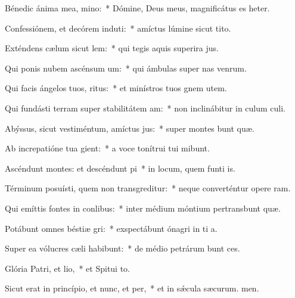\item Bénedic ánima mea, mino:~* Dómine, Deus meus, magnificátus es heter.
\item Confessiónem, et decórem induti:~* amíctus lúmine sicut tito.
\item Exténdens cælum sicut lem:~* qui tegis aquis superira jus.
\item Qui ponis nubem ascénsum um:~* qui ámbulas super nas venrum.
\item Qui facis ángelos tuos, ritus:~* et minístros tuos gnem utem.
\item Qui fundásti terram super stabilitátem am:~* non inclinábitur in culum culi.
\item Abýssus, sicut vestiméntum, amíctus jus:~* super montes bunt quæ.
\item Ab increpatióne tua gient:~* a voce tonítrui tui mibunt.
\item Ascéndunt montes: et descéndunt pi~* in locum, quem funti is.
\item Términum posuísti, quem non transgreditur:~* neque converténtur opere ram.
\item Qui emíttis fontes in conlibus:~* inter médium móntium pertransbunt quæ.
\item Potábunt omnes béstiæ gri:~* exspectábunt ónagri in ti a.
\item Super ea vólucres cæli habibunt:~* de médio petrárum bunt ces.
\item Glória Patri, et lio,~* et Spitui to.
\item Sicut erat in princípio, et nunc, et per,~* et in sǽcula sæcurum. men.
